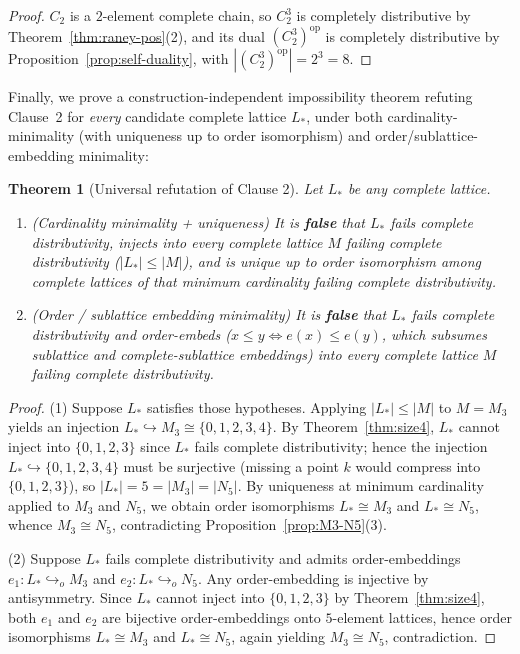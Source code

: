 \documentclass[11pt,a4paper]{article}
\theoremstyle{plain}
\newtheorem{theorem}{Theorem}[section]
\theoremstyle{definition}
\newcommand{\op}{\mathrm{op}}
\begin{document}
\begin{proof}
$C_2$ is a $2$-element complete chain, so $C_2^3$ is completely distributive by
Theorem~\ref{thm:raney-pos}(2), and its dual $(C_2^3)^{\op}$ is completely distributive by
Proposition~\ref{prop:self-duality}, with $|(C_2^3)^{\op}| = 2^3 = 8$.
\end{proof}

Finally, we prove a construction-independent impossibility theorem refuting Clause~2
for \emph{every} candidate complete lattice $L_*$, under both cardinality-minimality (with
uniqueness up to order isomorphism) and order/sublattice-embedding minimality:

\begin{theorem}[Universal refutation of Clause 2]
\label{thm:clause2-false}
Let $L_*$ be any complete lattice.
\begin{enumerate}
  \item \emph{(Cardinality minimality + uniqueness)} It is \textbf{false} that $L_*$ fails
    complete distributivity, injects into every complete lattice $M$ failing complete
    distributivity ($|L_*| \le |M|$), and is unique up to order isomorphism among complete
    lattices of that minimum cardinality failing complete distributivity.
  \item \emph{(Order / sublattice embedding minimality)} It is \textbf{false} that $L_*$
    fails complete distributivity and order-embeds ($x \le y \iff e(x) \le e(y)$, which
    subsumes sublattice and complete-sublattice embeddings) into every complete lattice
    $M$ failing complete distributivity.
\end{enumerate}
\end{theorem}

\begin{proof}
(1) Suppose $L_*$ satisfies those hypotheses. Applying $|L_*| \le |M|$ to $M = M_3$ yields
an injection $L_* \hookrightarrow M_3 \cong \{0,1,2,3,4\}$. By Theorem~\ref{thm:size4},
$L_*$ cannot inject into $\{0,1,2,3\}$ since $L_*$ fails complete distributivity; hence
the injection $L_* \hookrightarrow \{0,1,2,3,4\}$ must be surjective (missing a point $k$
would compress into $\{0,1,2,3\}$), so $|L_*| = 5 = |M_3| = |N_5|$. By uniqueness at
minimum cardinality applied to $M_3$ and $N_5$, we obtain order isomorphisms
$L_* \cong M_3$ and $L_* \cong N_5$, whence $M_3 \cong N_5$, contradicting
Proposition~\ref{prop:M3-N5}(3).

(2) Suppose $L_*$ fails complete distributivity and admits order-embeddings
$e_1 : L_* \hookrightarrow_o M_3$ and $e_2 : L_* \hookrightarrow_o N_5$. Any
order-embedding is injective by antisymmetry. Since $L_*$ cannot inject into $\{0,1,2,3\}$
by Theorem~\ref{thm:size4}, both $e_1$ and $e_2$ are bijective order-embeddings onto
$5$-element lattices, hence order isomorphisms $L_* \cong M_3$ and $L_* \cong N_5$,
again yielding $M_3 \cong N_5$, contradiction.
\end{proof}
\end{document}
